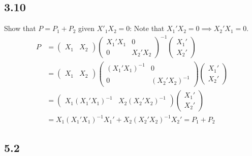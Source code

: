\documentclass{article}[14pt]
\begin{document}
    \subsection*{3.10}

    Show that $P = P_1 + P_2$ given $X'_1 X_2 = 0$: Note that $X_1' X_2 = 0 \implies X_2'X_1 = 0$.
    \begin{align*}
        P &= \begin{pmatrix} X_1 & X_2 \end{pmatrix}
            \begin{pmatrix} X_1' X_1 & 0 \\ 0 & X_2' X_2 \end{pmatrix}^{-1}
            \begin{pmatrix} X_1' \\ X_2' \end{pmatrix} \\
        &= \begin{pmatrix} X_1 & X_2 \end{pmatrix}
            \begin{pmatrix} (X_1' X_1)^{-1} & 0 \\ 0 & (X_2' X_2)^{-1} \end{pmatrix}
            \begin{pmatrix} X_1' \\ X_2' \end{pmatrix} \\
        &= \begin{pmatrix} X_1 (X_1'X_1)^{-1} & X_2 (X_2'X_2)^{-1} \end{pmatrix}
            \begin{pmatrix} X_1' \\ X_2' \end{pmatrix}\\
        &= X_1 (X_1'X_1)^{-1}X_1' + X_2 (X_2'X_2)^{-1}X_2' = P_1 + P_2
    \end{align*}

    \subsection*{5.2}
\end{document}
